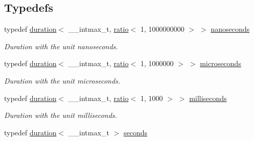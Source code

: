 \subsection*{Typedefs}
\begin{DoxyCompactItemize}
\item 
typedef \hyperlink{classtthread_1_1chrono_1_1duration}{duration}$<$ \+\_\+\+\_\+intmax\+\_\+t, \hyperlink{classtthread_1_1ratio}{ratio}$<$ 1, 1000000000 $>$ $>$ \hyperlink{namespacetthread_1_1chrono_a14269b4a249c549e6658e2c2518d41c1}{nanoseconds}\hypertarget{namespacetthread_1_1chrono_a14269b4a249c549e6658e2c2518d41c1}{}\label{namespacetthread_1_1chrono_a14269b4a249c549e6658e2c2518d41c1}

\begin{DoxyCompactList}\small\item\em Duration with the unit nanoseconds. \end{DoxyCompactList}\item 
typedef \hyperlink{classtthread_1_1chrono_1_1duration}{duration}$<$ \+\_\+\+\_\+intmax\+\_\+t, \hyperlink{classtthread_1_1ratio}{ratio}$<$ 1, 1000000 $>$ $>$ \hyperlink{namespacetthread_1_1chrono_a33c0e4fb0e9537dd97fe488df2f2a2a3}{microseconds}\hypertarget{namespacetthread_1_1chrono_a33c0e4fb0e9537dd97fe488df2f2a2a3}{}\label{namespacetthread_1_1chrono_a33c0e4fb0e9537dd97fe488df2f2a2a3}

\begin{DoxyCompactList}\small\item\em Duration with the unit microseconds. \end{DoxyCompactList}\item 
typedef \hyperlink{classtthread_1_1chrono_1_1duration}{duration}$<$ \+\_\+\+\_\+intmax\+\_\+t, \hyperlink{classtthread_1_1ratio}{ratio}$<$ 1, 1000 $>$ $>$ \hyperlink{namespacetthread_1_1chrono_a8bf64c23d4a358a24065fc6d6190205f}{milliseconds}\hypertarget{namespacetthread_1_1chrono_a8bf64c23d4a358a24065fc6d6190205f}{}\label{namespacetthread_1_1chrono_a8bf64c23d4a358a24065fc6d6190205f}

\begin{DoxyCompactList}\small\item\em Duration with the unit milliseconds. \end{DoxyCompactList}\item 
typedef \hyperlink{classtthread_1_1chrono_1_1duration}{duration}$<$ \+\_\+\+\_\+intmax\+\_\+t $>$ \hyperlink{namespacetthread_1_1chrono_af6eca09e946756c1070bddee6d897efb}{seconds}\hypertarget{namespacetthread_1_1chrono_af6eca09e946756c1070bddee6d897efb}{}\label{namespacetthread_1_1chrono_af6eca09e946756c1070bddee6d897efb}


\end{DoxyCompactItemize}

